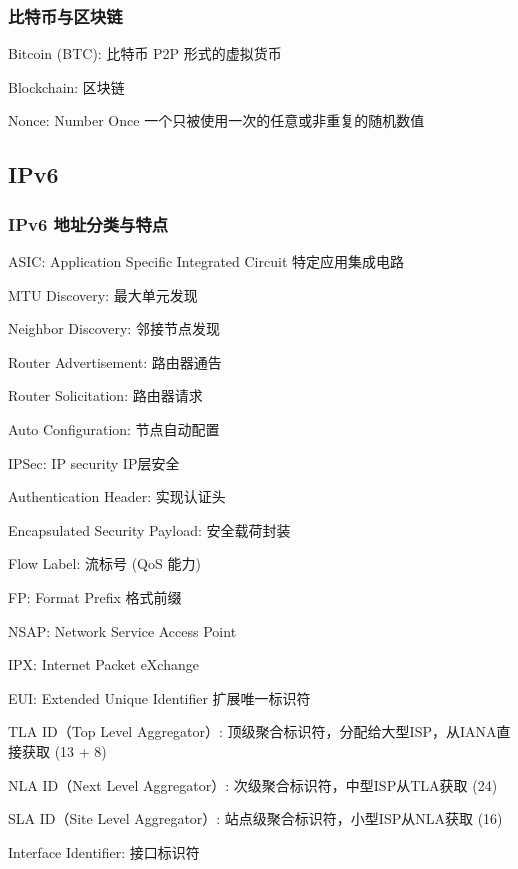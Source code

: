 \documentclass[UTF8,cs4size]{ctexart}
\begin{document}
\subsubsection{比特币与区块链}
\begin{compactitem}
  \item Bitcoin (BTC): 比特币 P2P 形式的虚拟货币
  \item Blockchain: 区块链
  \item Nonce: Number Once 一个只被使用一次的任意或非重复的随机数值
\end{compactitem}

\subsection{IPv6}
\subsubsection{IPv6 地址分类与特点}
\begin{compactitem}
  \item ASIC: Application Specific Integrated Circuit 特定应用集成电路
  \item MTU Discovery: 最大单元发现
  \item Neighbor Discovery: 邻接节点发现
  \item Router Advertisement: 路由器通告
  \item Router Solicitation: 路由器请求
  \item Auto Configuration: 节点自动配置
  \item IPSec: IP security IP层安全
  \item Authentication Header: 实现认证头
  \item Encapsulated Security Payload: 安全载荷封装
  \item Flow Label: 流标号 (QoS 能力)
  \item FP: Format Prefix 格式前缀
  \item NSAP: Network Service Access Point
  \item IPX: Internet Packet eXchange
  \item EUI: Extended Unique Identifier 扩展唯一标识符
  \item TLA ID（Top Level Aggregator）: 顶级聚合标识符，分配给大型ISP，从IANA直接获取 (13 + 8)
  \item NLA ID（Next Level Aggregator）: 次级聚合标识符，中型ISP从TLA获取 (24)
  \item SLA ID（Site Level Aggregator）: 站点级聚合标识符，小型ISP从NLA获取 (16)
  \item Interface Identifier: 接口标识符
\end{compactitem}
\end{document}
